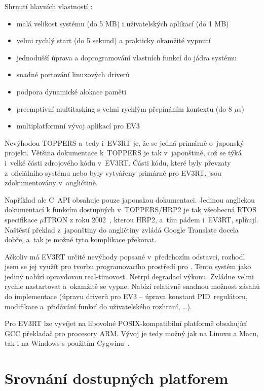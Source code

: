 Shrnutí hlavních vlastností \evRT:

\begin{itemize}
	\item malá velikost systému (do 5 MB) i uživatelských aplikací (do 1 MB)
	\item velmi rychlý start (do 5 sekund) a prakticky okamžité vypnutí
	\item jednodušší úprava a doprogramování vlastních funkcí do jádra systému
	\item snadné portování linuxových driverů
	\item podpora dynamické alokace paměti
	\item preemptivní multitasking s velmi rychlým přepínáním kontextu (do 8 $\mu$s)
	\item multiplatformní vývoj aplikací pro EV3
\end{itemize}
 
Nevýhodou TOPPERS a~tedy i~EV3RT je, že se jedná primárně o~japonský projekt. 
Většina dokumentace k~TOPPERS je tak v~japonštině, což se týká i~velké části zdrojového kódu v~EV3RT. 
Části kódu, které byly převzaty z~oficiálního \lego{} systému nebo byly vytvářeny primárně pro EV3RT, jsou zdokumentovány v~angličtině. 

Například ale C~API obsahuje pouze japonskou dokumentaci.
Jedinou anglickou dokumentací k funkcím dostupných v~TOPPERS/HRP2 je tak všeobecná RTOS specifikace $\mu$ITRON z roku 2002~\cite{legoProgramingPlatform_TOPPERS-IRON}, kterou HRP2, a~tím pádem i~EV3RT, splňují. %
Naštěstí překlad z~japonštiny do angličtiny zvládá Google Translate docela dobře, a~tak je možné tyto komplikace překonat.


Ačkoliv má EV3RT určité nevýhody popsané v~předchozím odstavci, rozhodl jsem se jej využít pro tvorbu programovacího prostředí pro \legoEV{}.
Tento systém jako jediný nabízí opravdovou real-timovost.
Netrpí degradací výkonu.
Zvládne velmi rychle nastartovat a~okamžitě se vypne. 
Nabízí relativně snadnou možnost zásahů do implementace (úpravu driverů pro EV3 -- úprava konstant PID~regulátoru, modifikace a~přidávání funkcí do uživatelského rozhraní, \dots). 

Pro EV3RT lze vyvíjet na libovolné POSIX-kompatibilní platformě obsahující GCC překladač pro procesory ARM. Vývoj je tedy možný jak na Linuxu a Macu, tak i na Windows s použitím Cygwinu~\cite{legoProgramingPlatform_EV3RT-git-web_get-started}.


\section{Srovnání dostupných platforem}
\label{lego-soft-summary}

